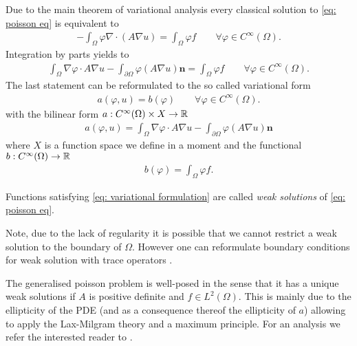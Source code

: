 Due to the main theorem of variational analysis every classical solution to \eqref{eq: poisson eq} is equivalent to 
\begin{align}
	-\int_\Omega \varphi \nabla \cdot (A \nabla u) = \int_\Omega \varphi f \qquad \forall \varphi \in C^\infty(\Omega).\label{eq: variational form}
\end{align}
Integration by parts yields to
\begin{align}
	\int_\Omega \nabla \varphi  \cdot A\nabla u -\int_{\partial \Omega} \varphi (A\nabla u) \mathbf{n}  = \int_\Omega \varphi f \qquad \forall \varphi \in C^\infty(\Omega). \label{eq: FE integration by parts}
\end{align}
The last statement can be reformulated to the so called variational form 
\begin{align}
a(\varphi,u)  = b(\varphi) \qquad \forall \varphi \in C^\infty(\Omega). \label{eq: variational formulation}
\end{align}
with the bilinear form $a:C^\infty(\Omega) \times X \rightarrow \mathbb{R}$
\begin{align*}
a(\varphi,u) = \int_\Omega \nabla \varphi  \cdot A\nabla u -\int_{\partial \Omega} \varphi (A\nabla u) \mathbf{n}
\end{align*}
where $X$ is a function space we define in a moment and the functional $b:C^\infty(\Omega) \rightarrow \mathbb{R}$
\begin{align*}
 b(\varphi)  = \int_\Omega \varphi f.
\end{align*}


\begin{definition}
	Functions satisfying \eqref{eq: variational formulation} are called \emph{weak solutions} of \eqref{eq: poisson eq}.
\end{definition}
Note, due to the lack of regularity it is possible that we cannot restrict a weak solution to the boundary of $\Omega$. However one can reformulate boundary conditions for weak solution with trace operators \cite[Section 5.5]{Evans1998}.

The generalised poisson problem is well-posed in the sense that it has a unique weak solutions if $A$ is positive definite and $f\in L^2(\Omega)$. This is mainly due to the ellipticity of the PDE (and as a consequence thereof the ellipticity of $a$) allowing to apply the Lax-Milgram theory and a maximum principle. For an analysis we refer the interested reader to \cite[Chapter~6]{Evans1998}.


